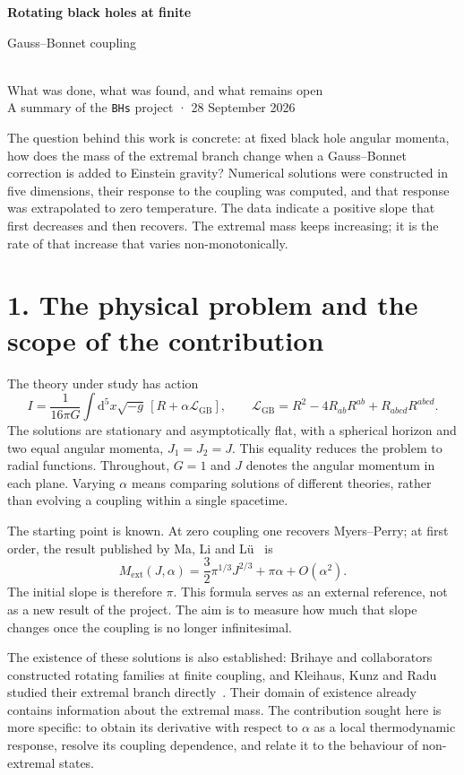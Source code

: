 \documentclass[11pt,a4paper]{article}
\newcommand{\ext}{\mathrm{ext}}
\newcommand{\GB}{\mathrm{GB}}
\newcommand{\dd}{\mathrm{d}}
\begin{document}
\begin{center}
{\Large\bfseries Rotating black holes at finite\par Gauss--Bonnet coupling}\\[7pt]
{\large What was done, what was found, and what remains open}\\[5pt]
{\small A summary of the \texttt{BHs} project · 28 September 2026}
\end{center}

\noindent The question behind this work is concrete: at fixed black hole angular momenta, how does the mass of the extremal branch change when a Gauss--Bonnet correction is added to Einstein gravity? Numerical solutions were constructed in five dimensions, their response to the coupling was computed, and that response was extrapolated to zero temperature. The data indicate a positive slope that first decreases and then recovers. The extremal mass keeps increasing; it is the rate of that increase that varies non-monotonically.

\section*{1. The physical problem and the scope of the contribution}
The theory under study has action
\begin{equation}
 I=\frac{1}{16\pi G}\int\dd^5x\sqrt{-g}\,[R+\alpha\mathcal L_{\GB}],
 \qquad \mathcal L_{\GB}=R^2-4R_{ab}R^{ab}+R_{abcd}R^{abcd}.
\end{equation}
The solutions are stationary and asymptotically flat, with a spherical horizon and two equal angular momenta, $J_1=J_2=J$. This equality reduces the problem to radial functions. Throughout, $G=1$ and $J$ denotes the angular momentum in each plane. Varying $\alpha$ means comparing solutions of different theories, rather than evolving a coupling within a single spacetime.

The starting point is known. At zero coupling one recovers Myers--Perry; at first order, the result published by Ma, Li and Lü~\cite{pert} is
\begin{equation}
 M_\ext(J,\alpha)=\frac32\pi^{1/3}J^{2/3}+\pi\alpha+O(\alpha^2).
 \label{eq:pert}
\end{equation}
The initial slope is therefore $\pi$. This formula serves as an external reference, not as a new result of the project. The aim is to measure how much that slope changes once the coupling is no longer infinitesimal.

The existence of these solutions is also established: Brihaye and collaborators constructed rotating families at finite coupling, and Kleihaus, Kunz and Radu studied their extremal branch directly~\cite{egb}. Their domain of existence already contains information about the extremal mass. The contribution sought here is more specific: to obtain its derivative with respect to $\alpha$ as a local thermodynamic response, resolve its coupling dependence, and relate it to the behaviour of non-extremal states.
\end{document}
